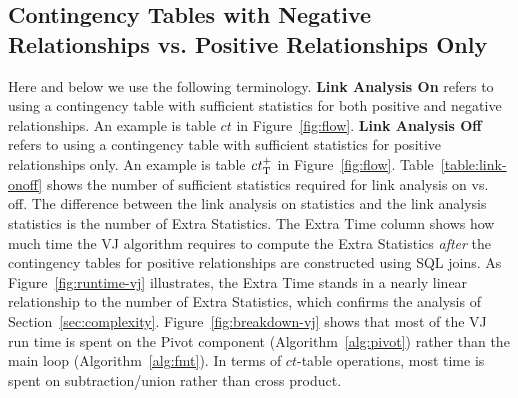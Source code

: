 \documentclass{acm_proc_article-sp}
\newcommand{\ct}{\mathit{ct}}
\begin{document}
\subsection{Contingency Tables with Negative Relationships vs. Positive Relationships Only} 

Here and below we use the following terminology. \textbf{Link Analysis On} refers to using a contingency table with sufficient statistics for both positive and negative relationships. 
An example is table $\ct$ in Figure~\ref{fig:flow}. 
\textbf{Link Analysis Off} refers to using a contingency table with sufficient statistics for positive relationships only. An example is table $\ct_{\true}^{+}$ %
 in Figure~\ref{fig:flow}. Table~\ref{table:link-onoff} shows the  number of sufficient statistics required for link analysis on vs. off. The difference between the link analysis on statistics  and the link analysis statistics is the number of Extra Statistics.
The Extra Time column shows how much time the VJ algorithm requires to compute the Extra Statistics {\em after} the contingency tables for positive relationships are constructed using SQL joins. As Figure~\ref{fig:runtime-vj} illustrates, the Extra Time stands in a nearly linear relationship to the number of Extra Statistics, which confirms the analysis of Section~\ref{sec:complexity}. Figure~\ref{fig:breakdown-vj} shows that most of the VJ run time is spent on the Pivot component (Algorithm~\ref{alg:pivot}) rather than the main loop (Algorithm~\ref{alg:fmt}). In terms of $\ct$-table operations, most time is spent on subtraction/union rather than cross product.
\end{document}
